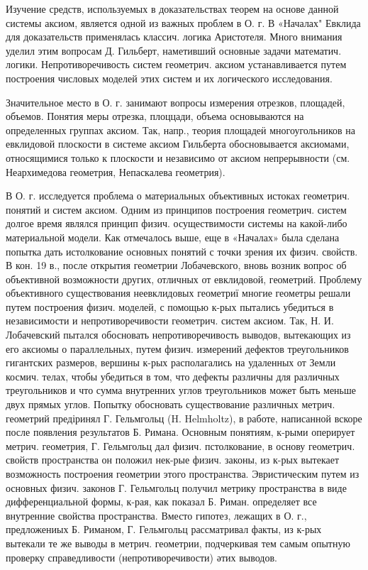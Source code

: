 \documentclass[10pt]{article}
\begin{document}
Изучение средств, используемых в доказательствах теорем на основе данной системы аксиом, является одной из важных проблем в О. г. В «Началах" Евклида для доказательств применялась классич. логика Аристотеля. Много внимания уделил этим вопросам Д. Гильберт, наметивший основные задачи математич. логики. Непротиворечивость систем геометрич. аксиом устанавливается путем построения числовых моделей этих систем и их логического исследования.

Значительное место в О. г. занимают вопросы измерения отрезков, площадей, объемов. Понятия меры отрезка, плоццади, объема основываются на определенных группах аксиом. Так, напр., теория площадеӥ многоугольников на евклидовой плоскости в системе аксиом Гильберта обосновывается аксиомами, относящимися только к плоскости и независимо от аксиом непрерывности (см. Неархимедова геометрия, Непаскалева геометрия).

В О. г. исследуется проблема о материальных объективных истоках геометрич. понятий и систем аксиом. Одним из принципов построения геометрич. систем долгое время являлся принцип физич. осуществимости системы на какой-либо материальной модели. Как отмечалось выше, еще в «Началах» была сделана попытка дать истолкование основных понятий с точки зрения их физич. свойств. В кон. 19 в., после открытия геометрии Лобачевского, вновь возник вопрос об объективной возможности других, отличных от евклидовой, геометрий. Проблему объективного существования неевклидовых геометриї многие геометры решали путем построения физич. моделей, с помощью к-рых пытались убедиться в независимости и непротиворечивости геометрич. систем аксиом. Так, Н. И. Лобачевский пытался обосновать непротиворечивость выводов, вытекающих из его аксиомы о параллельных, путем физич. измерений дефектов треугольников гигантских размеров, вершины к-рых располагались на удаленных от Земли космич. телах, чтобы убедиться в том, что дефекты различны для различных треугольников и что сумма внутренних углов треугольников может быть меньше двух прямых углов. Попытку обосновать существование различных метрич. геометрий предіринял Г. Гельмгольц (H. Helmholtz), в работе, написанной вскоре после появления результатов Б. Римана. Основным понятиям, к-рыми оперирует метрич. геометрия, Г. Гельмгольц дал физич. пстолкование, в основу геометрич. свойств пространства он положил нек-рые физич. законы, из к-рых вытекает возможность построения геометрии этого пространства. Эвристическим путем из основных физич. законов Г. Гельмгольц получил метрику пространства в виде дифференциальной формы, к-рая, как показал Б. Риман. определяет все внутренние свойства пространства. Вместо гипотез, лежащих в О. г., предложениых Б. Риманом, Г. Гельмгольц рассматривал факты, из к-рых вытекали те же выводы в метрич. геометрии, подчеркивая тем самым опытную проверку справедливости (непротиворечивости) әтих выводов.
\end{document}
